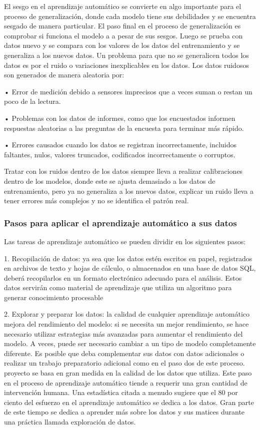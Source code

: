 \documentclass[
  letterpaper,
  DIV=11,
  numbers=noendperiod]{scrartcl}
\begin{document}
El sesgo en el aprendizaje automático se convierte en algo importante
para el proceso de generalización, donde cada modelo tiene sus
debilidades y se encuentra sesgado de manera particular. El paso final
en el proceso de generalización es comprobar si funciona el modelo a a
pesar de sus sesgos. Luego se prueba con datos nuevo y se compara con
los valores de los datos del entrenamiento y se generaliza a los nuevos
datos. Un problema para que no se generalicen todos los datos es por el
ruido o variaciones inexplicables en los datos. Los datos ruidosos son
generados de manera aleatoria por:

• Error de medición debido a sensores imprecisos que a veces suman o
restan un poco de la lectura.

• Problemas con los datos de informes, como que los encuestados informen
respuestas aleatorias a las preguntas de la encuesta para terminar más
rápido.

• Errores causados cuando los datos se registran incorrectamente,
incluidos faltantes, nulos, valores truncados, codificados
incorrectamente o corruptos.

Tratar con los ruidos dentro de los datos siempre lleva a realizar
calibraciones dentro de los modelos, donde este se ajusta demasiado a
los datos de entrenamiento, pero ya no generaliza a los nuevos datos,
explicar un ruido lleva a tener errores más complejos y no se identifica
el patrón real.

\hypertarget{pasos-para-aplicar-el-aprendizaje-automuxe1tico-a-sus-datos}{%
\subsubsection{Pasos para aplicar el aprendizaje automático a sus
datos}\label{pasos-para-aplicar-el-aprendizaje-automuxe1tico-a-sus-datos}}

Las tareas de aprendizaje automático se pueden dividir en los siguientes
pasos:

1. Recopilación de datos: ya sea que los datos estén escritos en papel,
registrados en archivos de texto y hojas de cálculo, o almacenados en
una base de datos SQL, deberá recopilarlos en un formato electrónico
adecuado para el análisis. Estos datos servirán como material de
aprendizaje que utiliza un algoritmo para generar conocimiento
procesable

2. Explorar y preparar los datos: la calidad de cualquier aprendizaje
automático mejora del rendimiento del modelo: si se necesita un mejor
rendimiento, se hace necesario utilizar estrategias más avanzadas para
aumentar el rendimiento del modelo. A veces, puede ser necesario cambiar
a un tipo de modelo completamente diferente. Es posible que deba
complementar sus datos con datos adicionales o realizar un trabajo
preparatorio adicional como en el paso dos de este proceso. proyecto se
basa en gran medida en la calidad de los datos que utiliza. Este paso en
el proceso de aprendizaje automático tiende a requerir una gran cantidad
de intervención humana. Una estadística citada a menudo sugiere que el
80 por ciento del esfuerzo en el aprendizaje automático se dedica a los
datos. Gran parte de este tiempo se dedica a aprender más sobre los
datos y sus matices durante una práctica llamada exploración de datos.
\end{document}
